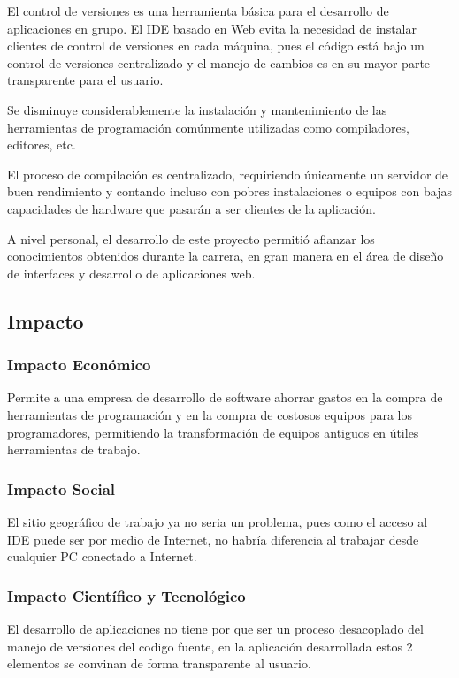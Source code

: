 El control de versiones es una herramienta básica para el desarrollo de aplicaciones en grupo. El IDE basado en Web evita la necesidad de instalar clientes de control de versiones en cada máquina, pues el código está bajo un control de versiones centralizado y el manejo de cambios es en su mayor parte transparente para el usuario.

Se disminuye considerablemente la instalación y mantenimiento de las herramientas de programación comúnmente utilizadas como compiladores, editores, etc.

El proceso de compilación es centralizado, requiriendo únicamente un servidor de buen rendimiento y contando incluso con pobres instalaciones o equipos con bajas capacidades de hardware que pasarán a ser clientes de la aplicación.

A nivel personal, el desarrollo de este proyecto permitió afianzar los conocimientos obtenidos durante la carrera, en gran manera en el área de diseño de interfaces y desarrollo de aplicaciones web.


\subsection{Impacto}

\subsubsection{Impacto Económico}

Permite a una empresa de desarrollo de software ahorrar gastos en la compra de herramientas de programación y en la compra de costosos equipos para los programadores, permitiendo la transformación de equipos antiguos en útiles herramientas de trabajo.

\subsubsection{Impacto Social}

El sitio geográfico de trabajo ya no seria un problema, pues como el acceso al IDE puede ser por medio de Internet, no habría diferencia al trabajar desde cualquier PC conectado a Internet.

\subsubsection{Impacto Científico y Tecnológico}

El desarrollo de aplicaciones no tiene por que ser un proceso desacoplado del manejo de versiones del codigo fuente, en la aplicación desarrollada estos 2 elementos se convinan de forma transparente al usuario.
